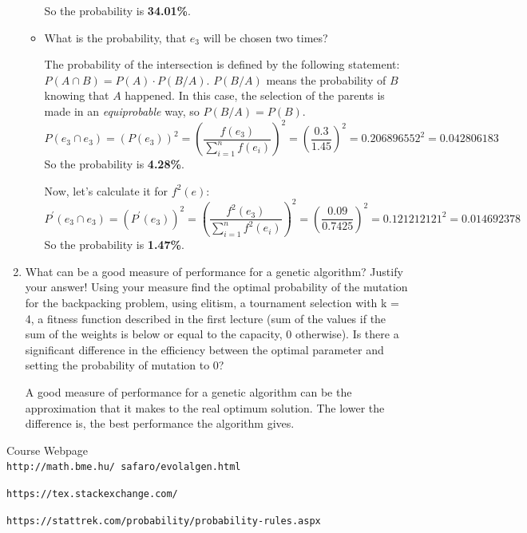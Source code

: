 \documentclass[12pt,english]{article}
\newenvironment{statement}{\fontfamily{ptm}\selectfont}{\par}
\begin{document}
\begin{enumerate}
\begin{itemize}
			So the probability is \textbf{34.01\%}.

		\item
		\begin{statement}
			What is the probability, that $e_3$ will be chosen two times?
		\end{statement}

		The probability of the intersection is defined by the following statement:
		$ P(A \cap B) = P(A) \cdot P(B/A)$.
		$P(B/A)$ means the probability of $B$ knowing that $A$ happened. In this case, the selection of the parents is made in an \emph{equiprobable} way, so $P(B/A) = P(B)$.
		\[
			P(e_3 \cap e_3) = (P(e_3))^2 = (\frac{f(e_3)}{\sum_{i=1}^{n}{f(e_i)}})^2 = (\frac{0.3}{1.45})^2 =
			0.206896552^2= 0.042806183
		\]
		So the probability is \textbf{4.28\%}.

		Now, let's calculate it for $f^2(e)$:
		\[
			P^{\prime}(e_3 \cap e_3) = (P^{\prime}(e_3))^2 = (\frac{f^{2}(e_3)}{\sum_{i=1}^{n}{f^{2}(e_i)}})^2 = (\frac{0.09}{0.7425})^2 =
			0.121212121^2= 0.014692378
		\]
		So the probability is \textbf{1.47\%}.

	\end{itemize}
	\item
		\begin{statement}		
			What can be a good measure of performance for a genetic algorithm? Justify your answer! Using your measure find the optimal probability of the mutation for the backpacking problem, using elitism, a tournament selection with k = 4, a fitness function described in the first lecture (sum of the values if the sum of the weights is below or equal to the capacity, 0 otherwise). Is there a significant difference in the efficiency between the optimal parameter and setting the probability of mutation to 0?
		\end{statement}

	A good measure of performance for a genetic algorithm can be the approximation that it makes to the real optimum solution. The lower the difference is, the best performance the algorithm gives.

\end{enumerate}


\begin{thebibliography}{9}

Course Webpage
\\\texttt{http://math.bme.hu/~safaro/evolalgen.html}


\texttt{https://tex.stackexchange.com/}

\texttt{https://stattrek.com/probability/probability-rules.aspx}


\end{thebibliography}
\end{document}
